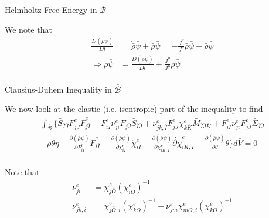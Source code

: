\documentclass[11pt]{beamer}
\begin{document}
\begin{frame}{Helmholtz Free Energy in $\bar{\mathcal{B}}$}

We note that
\begin{align*}
\frac{D\left(\bar{\rho}\bar{\psi}\right)}{Dt} &= \dot{\bar{\rho}} \bar{\psi} + \bar{\rho} \dot{\bar{\psi}} = -\frac{\dot{J}^p}{J^p} \bar{\rho} \bar{\psi} + \bar{\rho} \dot{\bar{\psi}}\\
\Rightarrow \bar{\rho} \dot{\bar{\psi}} &= \frac{D\left(\bar{\rho}\bar{\psi}\right)}{Dt} + \frac{\dot{J}^p}{J^p} \bar{\rho} \bar{\psi}\\
\end{align*}

\end{frame}

\begin{frame}{Clausius-Duhem Inequality in $\bar{\mathcal{B}}$}

We now look at the elastic (i.e. isentropic) part of the inequality to find
\begin{align*}
 \int_{\bar{\mathcal{B}}} \bigg\{\bar{S}_{\bar{I}\bar{J}} {F_{j\bar{J}}^e} \dot{F}_{j\bar{I}}^e - F_{i\bar{I}}^e \nu_{ji}^e F_{j\bar{J}} \bar{S}_{\bar{I}\bar{J}} + \nu_{jk,\bar{I}}^e F_{j\bar{J}}^e \chi_{k\bar{K}}^e  \bar{M}_{\bar{I}\bar{J}\bar{K}} + F_{i\bar{I}}^e \nu_{ji}^e F_{j\bar{J}}^e \bar{\Sigma}_{\bar{I}\bar{J}}\\
 - \bar{\rho} \dot{\theta} \bar{\eta} - \frac{\partial \left(\bar{\rho}\bar{\psi}\right)}{\partial F_{i\bar{I}}^e} \dot{F}_{i\bar{I}}^e - \frac{\partial\left(\bar{\rho}\bar{\psi}\right)}{\partial \chi_{i\bar{I}}^e} \dot{\chi}_{i\bar{I}}^e - \frac{\partial \left(\bar{\rho}\bar{\psi}\right)}{\partial \chi_{i\bar{K},\bar{I}}^e} \dot{\partial \chi}_{i\bar{K},\bar{I}}^e -
\frac{\partial\left(\bar{\rho}\bar{\psi}\right)}{\partial \theta}\dot{\theta} \bigg\} d\bar{V} =  0\\
\end{align*}

Note that
\begin{align*}
\nu_{ji}^e &= \dot{\chi}_{j\bar{O}}^e\left(\chi_{i\bar{O}}^e\right)^{-1}\\
\nu_{jk,i}^e &= \dot{\chi}_{j\bar{O},i}^e\left(\chi_{k\bar{O}}^e\right)^{-1} - \nu_{jm}^e \chi_{m\bar{O},i}^e \left(\chi_{k\bar{O}}^e\right)^{-1}
\end{align*}
\end{frame}
\end{document}

